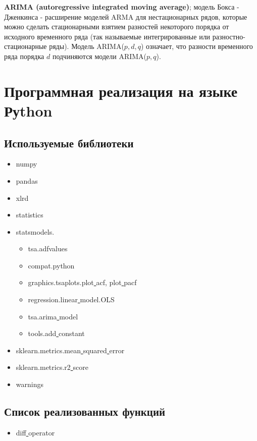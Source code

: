\documentclass{article}
\begin{document}
  \textbf{ARIMA (autoregressive integrated moving average)}; модель Бокса - Дженкинса - расширение моделей ARMA для нестационарных рядов, которые можно сделать стационарными взятием разностей некоторого порядка от исходного временного ряда (так называемые интегрированные или разностно-стационарные ряды). Модель ARIMA($p, d, q$) означает, что разности временного ряда порядка $d$ подчиняются модели ARIMA($p, q$).\par

\newpage

\section{Программная реализация на языке Руthon}
  
  \subsection{Используемые библиотеки}
  
  \begin{itemize}
  	\item numpy
  	\item pandas
  	\item xlrd
  	\item statistics
  	\item statsmodels.
  	\begin{itemize}
  		\item tsa.adfvalues
  		\item compat.python
  		\item graphics.tsaplots.plot\underline{ }acf, plot\underline{ }pacf
  		\item regression.linear\underline{ }model.OLS
  		\item tsa.arima\underline{ }model
  		\item tools.add\underline{ }constant
  	\end{itemize}
    \item sklearn.metrics.mean\underline{ }squared\underline{ }error
    \item sklearn.metrics.r2\underline{ }score
    \item warnings
  \end{itemize}
  
  \subsection{Список реализованных функций}
  
  \begin{itemize}
  	\item diff\underline{ }operator
  	
  \end{itemize}
  
\end{document}
